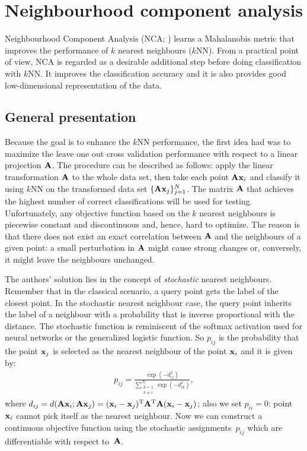 \chapter{Neighbourhood component analysis}
\label{ch:nca}

	Neighbourhood Component Analysis (NCA; \citealp{goldberger2004}) learns a Mahalanobis metric that improves the performance of $k$ nearest neighbours ($k$NN). From a practical point of view, NCA  is regarded as a desirable additional step before doing classification with $k$NN. It improves the classification accuracy and it is also provides good low-dimensional representation of the data.

\section{General presentation}
\label{sec:general-presentation}

	Because the goal is to enhance the $k$NN performance, the first idea \citet{goldberger2004}
	had was to maximize the leave one out cross validation performance with respect to a linear projection $\mathbf{A}$. The procedure can be described as follows: apply the linear transformation $\mathbf{A}$ to the whole data set, then take each 
	point $\mathbf{A}\mathbf{x}_i$ and classify it using $k$NN on the transformed data set $\{\mathbf{A}\mathbf{x}_j\}_{j=1}^N$. The matrix $\mathbf{A}$ that achieves the highest number of correct classifications will be used for testing. Unfortunately, any objective function based on the $k$ nearest neighbours
	is piecewise constant and discontinuous and, hence, hard to optimize. The reason is that there does
	not exist an exact correlation between $\mathbf{A}$ and the neighbours
	of a given point: a small perturbation in $\mathbf{A}$ might cause strong changes or, conversely, 
	it might leave the neighbours unchanged.
	
	The authors' solution lies in the concept of \textit{stochastic} nearest
	neighbours. Remember that in the classical scenario, a query point gets the label of the closest point. In the stochastic nearest neighbour 
	case, the query point inherits the label of a neighbour with a probability that is inverse proportional with the distance. The stochastic function is reminiscent of the softmax activation used for neural networks or the generalized logistic function. So $p_{ij}$ is the probability that the point $\mathbf{x}_j$ is selected as the nearest neighbour of the point $\mathbf{x}_i$ and it is given by:
	\begin{align}
		p_{ij} = \frac{
						\exp(-d_{ij}^2)
					  }{
						\sum_{\substack{k=1 \\k\neq i}}^N\exp(-d_{ik}^2)
					  },
	\label{eq:stochastic-neighbour}
	\end{align} where $d_{ij} = d(\mathbf{A}\mathbf{x}_i;\mathbf{A}\mathbf{x}_j) = (\mathbf{x}_i-\mathbf{x}_j)^\textrm{T}\mathbf{A}^\textrm{T}\mathbf{A}(\mathbf{x}_i-\mathbf{x}_j)$; also we set $p_{ii}=0$: point~$\mathbf{x}_i$ cannot pick itself as the nearest neighbour.
	Now we can construct a continuous objective function using the stochastic assignments~$p_{ij}$ which are differentiable with respect to~$\mathbf{A}$.
	
